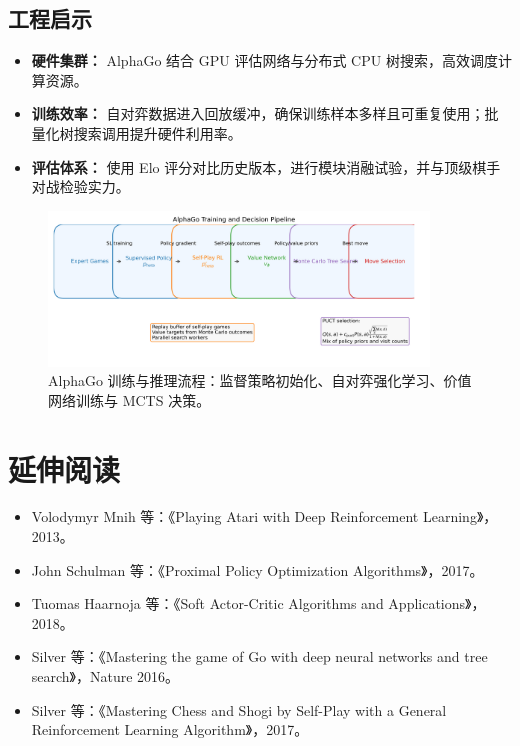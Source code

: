 \documentclass[UTF8,zihao=-4]{ctexart}
\begin{document}
\subsection{工程启示}
\begin{itemize}
  \item \textbf{硬件集群：} AlphaGo 结合 GPU 评估网络与分布式 CPU 树搜索，高效调度计算资源。
  \item \textbf{训练效率：} 自对弈数据进入回放缓冲，确保训练样本多样且可重复使用；批量化树搜索调用提升硬件利用率。
  \item \textbf{评估体系：} 使用 Elo 评分对比历史版本，进行模块消融试验，并与顶级棋手对战检验实力。
\end{itemize}

\begin{figure}[H]
  \centering
  \includegraphics[width=0.9\textwidth]{alphago_pipeline.png}
  \caption{AlphaGo 训练与推理流程：监督策略初始化、自对弈强化学习、价值网络训练与 MCTS 决策。}
  \label{fig:alphago_pipeline_cn}
\end{figure}
\FloatBarrier

\section*{延伸阅读}
\begin{itemize}
  \item Volodymyr Mnih 等：《Playing Atari with Deep Reinforcement Learning》，2013。
  \item John Schulman 等：《Proximal Policy Optimization Algorithms》，2017。
  \item Tuomas Haarnoja 等：《Soft Actor-Critic Algorithms and Applications》，2018。
  \item Silver 等：《Mastering the game of Go with deep neural networks and tree search》，Nature 2016。
  \item Silver 等：《Mastering Chess and Shogi by Self-Play with a General Reinforcement Learning Algorithm》，2017。
\end{itemize}
\end{document}
